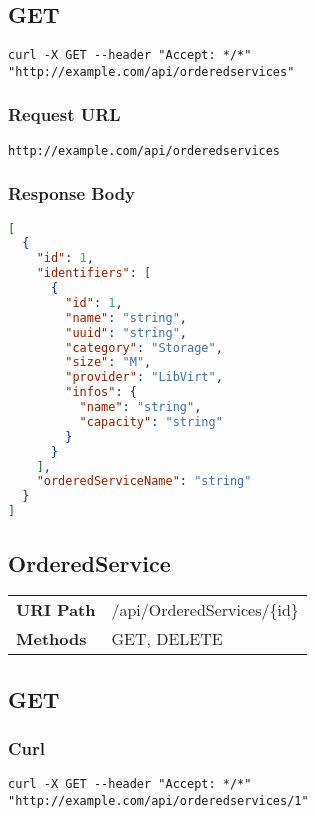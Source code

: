 \subsection{GET}
\begin{lstlisting}[style=Bash] 
curl -X GET --header "Accept: */*" "http://example.com/api/orderedservices"
\end{lstlisting}

\subsubsection{Request URL}
\begin{lstlisting}[] 
http://example.com/api/orderedservices
\end{lstlisting}

\subsubsection{Response Body}
\begin{lstlisting}[language=json] 
[
  {
    "id": 1,
    "identifiers": [
      {
        "id": 1,
        "name": "string",
        "uuid": "string",
        "category": "Storage",
        "size": "M",
        "provider": "LibVirt",
        "infos": {
          "name": "string",
          "capacity": "string"
        }
      }
    ],
    "orderedServiceName": "string"
  }
]
\end{lstlisting}

\subsection{OrderedService}
\begin{tabularx}{\linewidth}{l l}
\textbf{URI Path} & /api/OrderedServices/\{id\}\\
\textbf{Methods} & GET, DELETE\\
\end{tabularx}

\subsection{GET}
\subsubsection{Curl}
\begin{lstlisting}[] 
curl -X GET --header "Accept: */*" "http://example.com/api/orderedservices/1"
\end{lstlisting}

